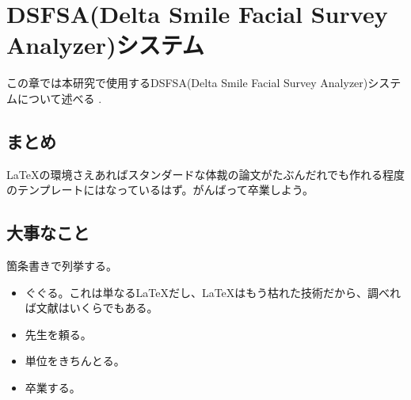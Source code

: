\chapter{DSFSA(Delta Smile Facial Survey Analyzer)システム}
\label{chap:aboutDSFSA}

この章では本研究で使用するDSFSA(Delta Smile Facial Survey Analyzer)システムについて述べる .

\section{まとめ}

\LaTeX の環境さえあればスタンダードな体裁の論文がたぶんだれでも作れる程度のテンプレートにはなっているはず。がんばって卒業しよう。


\section{大事なこと}

箇条書きで列挙する。

\begin{itemize}
 \item ぐぐる。これは単なる\LaTeX だし、\LaTeX はもう枯れた技術だから、調べれば文献はいくらでもある。
 \item 先生を頼る。
 \item 単位をきちんとる。
 \item 卒業する。
\end{itemize}
